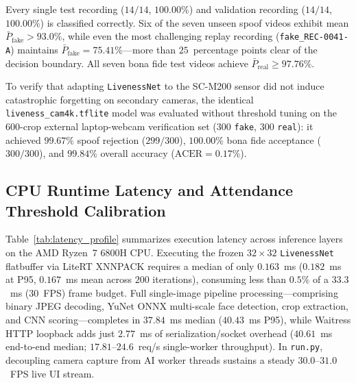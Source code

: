 Every single test recording ($14/14$, $100.00\%$) and validation recording ($14/14$, $100.00\%$) is classified correctly. Six of the seven unseen spoof videos exhibit mean $\bar{P}_{\text{fake}} > 93.0\%$, while even the most challenging replay recording (\texttt{fake\_REC-0041-A}) maintains $\bar{P}_{\text{fake}} = 75.41\%$---more than $25$~percentage points clear of the decision boundary. All seven bona fide test videos achieve $\bar{P}_{\text{real}} \ge 97.76\%$.

To verify that adapting \texttt{LivenessNet} to the SC-M200 sensor did not induce catastrophic forgetting on secondary cameras, the identical \texttt{liveness\_cam4k.tflite} model was evaluated without threshold tuning on the $600$-crop external laptop-webcam verification set ($300$ \texttt{fake}, $300$ \texttt{real}): it achieved $99.67\%$ spoof rejection ($299/300$), $100.00\%$ bona fide acceptance ($300/300$), and $99.84\%$ overall accuracy ($\text{ACER} = 0.17\%$).

\subsection{CPU Runtime Latency and Attendance Threshold Calibration}

Table~\ref{tab:latency_profile} summarizes execution latency across inference layers on the AMD Ryzen~7 6800H CPU. Executing the frozen $32\times32$ \texttt{LivenessNet} flatbuffer via LiteRT XNNPACK requires a median of only $0.163$~ms ($0.182$~ms at P95, $0.167$~ms mean across $200$ iterations), consuming less than $0.5\%$ of a $33.3$~ms ($30$~FPS) frame budget. Full single-image pipeline processing---comprising binary JPEG decoding, YuNet ONNX multi-scale face detection, crop extraction, and CNN scoring---completes in $37.84$~ms median ($40.43$~ms P95), while Waitress HTTP loopback adds just $2.77$~ms of serialization/socket overhead ($40.61$~ms end-to-end median; $17.81$--$24.6$~req/s single-worker throughput). In \texttt{run.py}, decoupling camera capture from AI worker threads sustains a steady $30.0$--$31.0$~FPS live UI stream.

